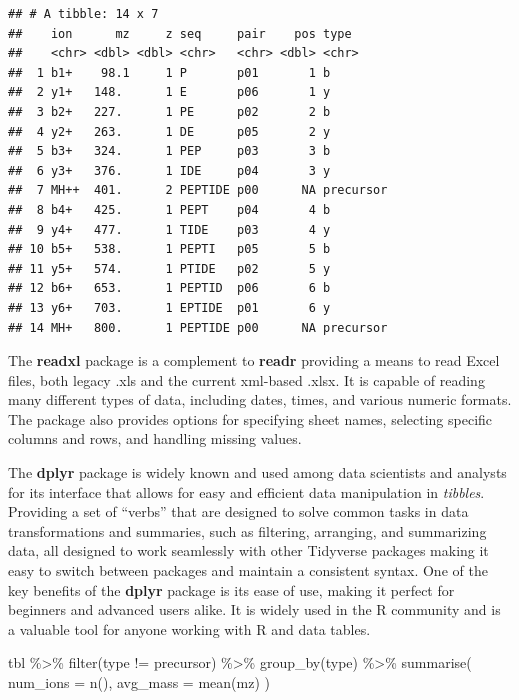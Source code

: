 \documentclass[
]{book}
\newenvironment{Shaded}{\begin{snugshade}}{\end{snugshade}}
\newcommand{\AttributeTok}[1]{\textcolor[rgb]{0.77,0.63,0.00}{#1}}
\newcommand{\FunctionTok}[1]{\textcolor[rgb]{0.00,0.00,0.00}{#1}}
\newcommand{\NormalTok}[1]{#1}
\newcommand{\SpecialCharTok}[1]{\textcolor[rgb]{0.00,0.00,0.00}{#1}}
\newcommand{\StringTok}[1]{\textcolor[rgb]{0.31,0.60,0.02}{#1}}
\begin{document}
\begin{verbatim}
## # A tibble: 14 x 7
##    ion      mz     z seq     pair    pos type     
##    <chr> <dbl> <dbl> <chr>   <chr> <dbl> <chr>    
##  1 b1+    98.1     1 P       p01       1 b        
##  2 y1+   148.      1 E       p06       1 y        
##  3 b2+   227.      1 PE      p02       2 b        
##  4 y2+   263.      1 DE      p05       2 y        
##  5 b3+   324.      1 PEP     p03       3 b        
##  6 y3+   376.      1 IDE     p04       3 y        
##  7 MH++  401.      2 PEPTIDE p00      NA precursor
##  8 b4+   425.      1 PEPT    p04       4 b        
##  9 y4+   477.      1 TIDE    p03       4 y        
## 10 b5+   538.      1 PEPTI   p05       5 b        
## 11 y5+   574.      1 PTIDE   p02       5 y        
## 12 b6+   653.      1 PEPTID  p06       6 b        
## 13 y6+   703.      1 EPTIDE  p01       6 y        
## 14 MH+   800.      1 PEPTIDE p00      NA precursor
\end{verbatim}

The \textbf{readxl} package is a complement to \textbf{readr} providing a means to read Excel files, both legacy .xls and the current xml-based .xlsx. It is capable of reading many different types of data, including dates, times, and various numeric formats. The package also provides options for specifying sheet names, selecting specific columns and rows, and handling missing values.

The \textbf{dplyr} package is widely known and used among data scientists and analysts for its interface that allows for easy and efficient data manipulation in \emph{tibbles}. Providing a set of ``verbs'' that are designed to solve common tasks in data transformations and summaries, such as filtering, arranging, and summarizing data, all designed to work seamlessly with other Tidyverse packages making it easy to switch between packages and maintain a consistent syntax. One of the key benefits of the \textbf{dplyr} package is its ease of use, making it perfect for beginners and advanced users alike. It is widely used in the R community and is a valuable tool for anyone working with R and data tables.

\begin{Shaded}
\begin{Highlighting}[]
\NormalTok{tbl }\SpecialCharTok{\%\textgreater{}\%} 
  \FunctionTok{filter}\NormalTok{(type }\SpecialCharTok{!=} \StringTok{\textquotesingle{}precursor\textquotesingle{}}\NormalTok{) }\SpecialCharTok{\%\textgreater{}\%} 
  \FunctionTok{group\_by}\NormalTok{(type) }\SpecialCharTok{\%\textgreater{}\%}
  \FunctionTok{summarise}\NormalTok{(}
    \AttributeTok{num\_ions =} \FunctionTok{n}\NormalTok{(),}
    \AttributeTok{avg\_mass =} \FunctionTok{mean}\NormalTok{(mz)}
\NormalTok{  )}
\end{Highlighting}
\end{Shaded}
\end{document}
